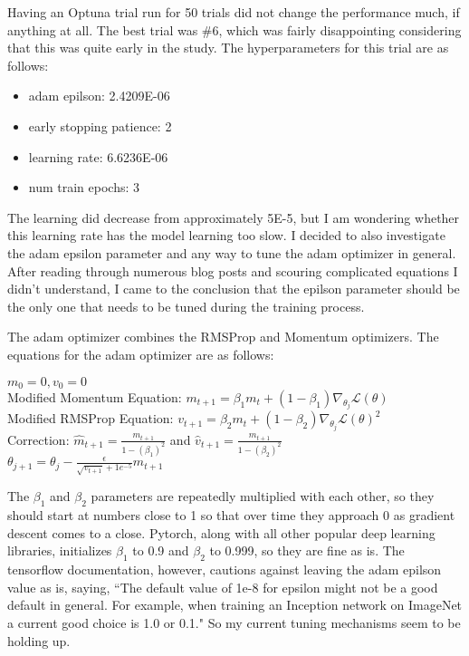 \documentclass[11pt,letterpaper]{article}
\begin{document}
Having an Optuna trial run for 50 trials did not change the performance much, if anything at all. The best trial was \#6, which was fairly disappointing considering that this was quite early in the study. The hyperparameters for this trial are as follows:

\begin{itemize}
\item adam epilson: 2.4209E-06
\item early stopping patience: 2
\item learning rate: 6.6236E-06
\item num train epochs: 3
\end{itemize}

The learning did decrease from approximately 5E-5, but I am wondering whether this learning rate has the model learning too slow. I decided to also investigate the adam epsilon parameter and any way to tune the adam optimizer in general. After reading through numerous blog posts and scouring complicated equations I didn't understand, I came to the conclusion that the epilson parameter should be the only one that needs to be tuned during the training process.  

The adam optimizer combines the RMSProp and Momentum optimizers. The equations for the adam optimizer are as follows: 

\begin{center}
$m_0 = 0, v_0 = 0$ \\
Modified Momentum Equation: $m_{t+1} = \beta_{1}m_t + (1 - \beta_{1})\nabla_{\theta_{j}}\mathcal{L}(\theta)$ \\
Modified RMSProp Equation: $v_{t+1} = \beta_{2}m_t + (1 - \beta_{2})\nabla_{\theta_{j}}\mathcal{L}(\theta)^2$ \\
Correction: $\hat{m}_{t+1} = \frac{m_{t+1}}{1-(\beta_1)^2}$ and $\hat{v}_{t+1} = \frac{m_{t+1}}{1-(\beta_2)^2}$ \\
$\theta_{j+1} = \theta_{j} - \frac{\epsilon}{\sqrt{v_{t+1}} + 1e^{-5}}m_{t+1}$
\end{center}

The $\beta_1$ and $\beta_2$ parameters are repeatedly multiplied with each other, so they should start at numbers close to 1 so that over time they approach 0 as gradient descent comes to a close. Pytorch, along with all other popular deep learning libraries, initializes $\beta_1$ to 0.9 and $\beta_2$ to 0.999, so they are fine as is. The tensorflow documentation, however, cautions against leaving the adam epilson value as is, saying, ``The default value of 1e-8 for epsilon might not be a good default in general. For example, when training an Inception network on ImageNet a current good choice is 1.0 or 0.1." So my current tuning mechanisms seem to be holding up.
\end{document}
